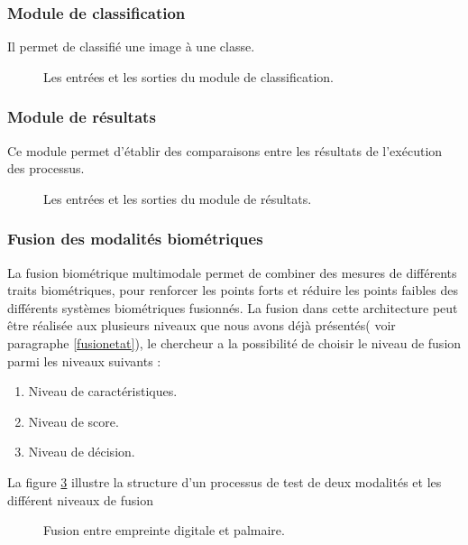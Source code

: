 \subsubsection{Module de classification}
Il permet de classifié une image à une classe.
\begin{figure}[H]
	\centering
	\caption{Les entrées et les sorties du module de classification.}
	\label{classModule}
\end{figure}
\subsubsection{Module de résultats}
Ce module permet d’établir des comparaisons entre les résultats de l’exécution des processus.
\begin{figure}[H]
	\centering
	
	\caption{Les entrées et les sorties du module de résultats.}
	\label{resltModule}
\end{figure}
\subsubsection{Fusion des modalités biométriques}
La fusion biométrique multimodale  permet de combiner des mesures de différents traits biométriques, pour renforcer les points forts et réduire les points faibles des différents systèmes biométriques fusionnés.
La fusion dans cette architecture peut être réalisée aux plusieurs niveaux que nous avons déjà présentés( voir paragraphe \ref{fusionetat}), le chercheur a la possibilité de choisir le niveau de fusion parmi les niveaux suivants :
\begin{enumerate}
	\item Niveau de caractéristiques.
	\item Niveau de score.
	\item Niveau de décision.
\end{enumerate}
La figure \ref{cenceptionfusion} illustre la structure d'un processus de test de deux modalités et les différent niveaux de fusion
\begin{figure}[H]
	\centering
	\caption{Fusion entre empreinte digitale et palmaire.}
	\label{cenceptionfusion}
\end{figure}

